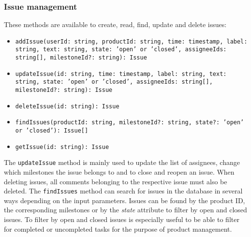     \subsubsection*{Issue management} 
    These methods are available to create, read, find, update and delete issues:
    \begin{itemize}
        \item \texttt{addIssue(userId: string, productId: string, time: timestamp, label: string, text: string, state: 'open' or 'closed', assigneeIds: string[], milestoneId?: string): Issue}
        \item \texttt{updateIssue(id: string, time: timestamp, label: string, text: string, state: 'open' or 'closed', assigneeIds: string[], milestoneId?: string): Issue}
        \item \texttt{deleteIssue(id: string): Issue}
        \item \texttt{findIssues(productId: string, milestoneId?: string, state?: 'open' or 'closed'): Issue[]}
        \item \texttt{getIssue(id: string): Issue}
    \end{itemize}
    The \texttt{updateIssue} method is mainly used to update the list of assignees, change which milestones the issue belongs to and to close and reopen an issue.
    When deleting issues, all comments belonging to the respective issue must also be deleted.
    The \texttt{findIssues} method can search for issues in the database in several ways depending on the input parameters. Issues can be found by the product ID, the corresponding milestones or by the \textit{state} attribute to filter by open and closed issues.
    To filter by open and closed issues is especially useful to be able to filter for completed or uncompleted tasks for the purpose of product management. 
    
